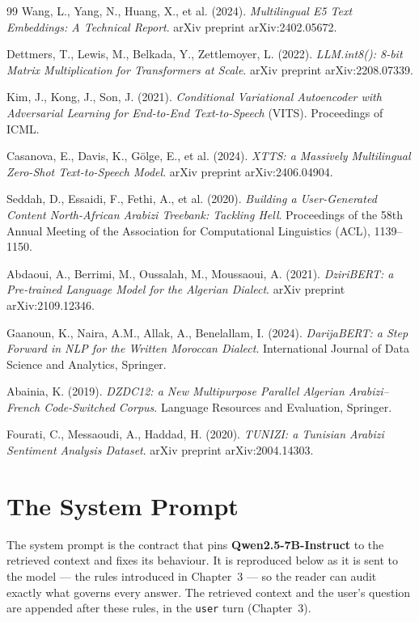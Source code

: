 \documentclass[12pt, a4paper]{report}
\newcommand{\humantext}[1]{#1}      %
\begin{document}
\begin{thebibliography}{99}
Wang, L., Yang, N., Huang, X., et al. (2024). \textit{Multilingual E5 Text Embeddings: A Technical Report}. arXiv preprint arXiv:2402.05672.

Dettmers, T., Lewis, M., Belkada, Y., Zettlemoyer, L. (2022). \textit{LLM.int8(): 8-bit Matrix Multiplication for Transformers at Scale}. arXiv preprint arXiv:2208.07339.

Kim, J., Kong, J., Son, J. (2021). \textit{Conditional Variational Autoencoder with Adversarial Learning for End-to-End Text-to-Speech} (VITS). Proceedings of ICML.

Casanova, E., Davis, K., Gölge, E., et al. (2024). \textit{XTTS: a Massively Multilingual Zero-Shot Text-to-Speech Model}. arXiv preprint arXiv:2406.04904.

Seddah, D., Essaidi, F., Fethi, A., et al. (2020). \textit{Building a User-Generated Content North-African Arabizi Treebank: Tackling Hell}. Proceedings of the 58th Annual Meeting of the Association for Computational Linguistics (ACL), 1139--1150.

Abdaoui, A., Berrimi, M., Oussalah, M., Moussaoui, A. (2021). \textit{DziriBERT: a Pre-trained Language Model for the Algerian Dialect}. arXiv preprint arXiv:2109.12346.

Gaanoun, K., Naira, A.M., Allak, A., Benelallam, I. (2024). \textit{DarijaBERT: a Step Forward in NLP for the Written Moroccan Dialect}. International Journal of Data Science and Analytics, Springer.

Abainia, K. (2019). \textit{DZDC12: a New Multipurpose Parallel Algerian Arabizi--French Code-Switched Corpus}. Language Resources and Evaluation, Springer.

Fourati, C., Messaoudi, A., Haddad, H. (2020). \textit{TUNIZI: a Tunisian Arabizi Sentiment Analysis Dataset}. arXiv preprint arXiv:2004.14303.

\end{thebibliography}

\appendix

\chapter{The System Prompt}
\label{app:prompt}
\humantext{The system prompt is the contract that pins \textbf{Qwen2.5-7B-Instruct} to the retrieved context and fixes its behaviour. It is reproduced below as it is sent to the model --- the \numRules{} rules introduced in Chapter~3 --- so the reader can audit exactly what governs every answer. The retrieved context and the user's question are appended after these rules, in the \texttt{user} turn (Chapter~3).}
\end{document}
